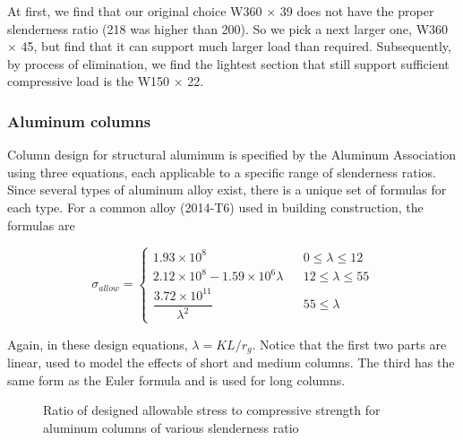 \documentclass[
10pt,
a4paper,
openany,
svgnames,
]{book}
\begin{document}
\begin{solution}
  At first, we find that our original choice W360 $\times$ 39 does not have the proper slenderness ratio (218 was higher than 200). So we pick a next larger one, W360 $\times$ 45, but find that it can support much larger load than required. Subsequently, by process of elimination, we find the lightest section that still support sufficient compressive load is the W150 $\times$ 22.
  
\end{solution}

\subsubsection{Aluminum columns}

Column design for structural aluminum is specified by the Aluminum Association using three equations, each applicable to a specific range of slenderness ratios. Since several types of aluminum alloy exist, there is a unique set of formulas for each type. For a common alloy (2014-T6) used in building construction, the formulas are

\begin{equation}
  \sigma_{allow} = \left\{
    \begin{array}{lcc}
      1.93 \times 10^8 &&  0 \leqslant \lambda \leqslant 12 \\[20pt] 
      2.12 \times 10^8 - 1.59 \times 10^6 \lambda && 12 \leqslant \lambda \leqslant 55 \\[20pt]
      \dfrac{3.72 \times 10^{11}}{ \lambda^2 } && 55 \leqslant \lambda 
    \end{array} \right.
\end{equation}

Again, in these design equations, $\lambda = KL/r_g$. Notice that the first two parts are linear, used to model the effects of short and medium columns. The third has the same form as the Euler formula and is used for long columns.

\begin{figure}[h]
  \centering
  \caption{Ratio of designed allowable stress to compressive strength for aluminum columns of various slenderness ratio}
  \label{fig: aluminum column}
\end{figure}
\end{document}
